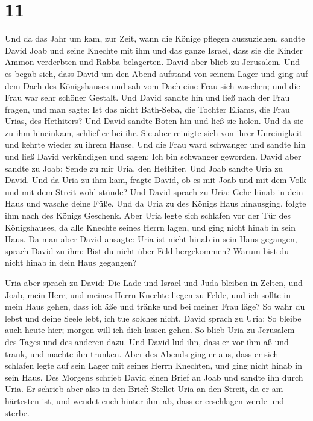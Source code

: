 \hypertarget{section-10}{%
\section{11}\label{section-10}}

 Und da das Jahr um kam, zur Zeit, wann die Könige pflegen
auszuziehen, sandte David Joab und seine Knechte mit ihm und das ganze
Israel, dass sie die Kinder Ammon verderbten und Rabba belagerten. David
aber blieb zu Jerusalem.  Und es begab sich, dass David um
den Abend aufstand von seinem Lager und ging auf dem Dach des
Königshauses und sah vom Dach eine Frau sich waschen; und die Frau war
sehr schöner Gestalt.  Und David sandte hin und ließ nach
der Frau fragen, und man sagte: Ist das nicht Bath-Seba, die Tochter
Eliams, die Frau Urias, des Hethiters?  Und David sandte
Boten hin und ließ sie holen. Und da sie zu ihm hineinkam, schlief er
bei ihr. Sie aber reinigte sich von ihrer Unreinigkeit und kehrte wieder
zu ihrem Hause.  Und die Frau ward schwanger und sandte
hin und ließ David verkündigen und sagen: Ich bin schwanger geworden.
 David aber sandte zu Joab: Sende zu mir Uria, den
Hethiter. Und Joab sandte Uria zu David.  Und da Uria zu
ihm kam, fragte David, ob es mit Joab und mit dem Volk und mit dem
Streit wohl stünde?  Und David sprach zu Uria: Gehe hinab
in dein Haus und wasche deine Füße. Und da Uria zu des Königs Haus
hinausging, folgte ihm nach des Königs Geschenk.  Aber
Uria legte sich schlafen vor der Tür des Königshauses, da alle Knechte
seines Herrn lagen, und ging nicht hinab in sein Haus. 
Da man aber David ansagte: Uria ist nicht hinab in sein Haus gegangen,
sprach David zu ihm: Bist du nicht über Feld hergekommen? Warum bist du
nicht hinab in dein Haus gegangen?

 Uria aber sprach zu David: Die Lade und Israel und Juda
bleiben in Zelten, und Joab, mein Herr, und meines Herrn Knechte liegen
zu Felde, und ich sollte in mein Haus gehen, dass ich äße und tränke und
bei meiner Frau läge? So wahr du lebst und deine Seele lebt, ich tue
solches nicht.  David sprach zu Uria: So bleibe auch
heute hier; morgen will ich dich lassen gehen. So blieb Uria zu
Jerusalem des Tages und des anderen dazu.  Und David lud
ihn, dass er vor ihm aß und trank, und machte ihn trunken. Aber des
Abends ging er aus, dass er sich schlafen legte auf sein Lager mit
seines Herrn Knechten, und ging nicht hinab in sein Haus.
 Des Morgens schrieb David einen Brief an Joab und sandte
ihn durch Uria.  Er schrieb aber also in den Brief:
Stellet Uria an den Streit, da er am härtesten ist, und wendet euch
hinter ihm ab, dass er erschlagen werde und sterbe.

